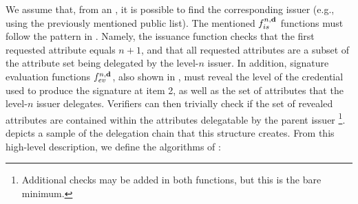 We assume that, from an \ipk, it is possible to find the corresponding issuer
(e.g., using the previously mentioned public list). The mentioned
$f_{is}^{n,\mathbf{d}}$ functions must follow the pattern in .
Namely, the issuance function checks that the first requested attribute equals
$n+1$, and that all requested attributes are a subset of the attribute set
\dattrs being delegated by the level-$n$ issuer. In addition, signature
evaluation functions $f_{ev}^{n,\mathbf{d}}$, also shown in ,
must reveal the level of the credential used to produce the \UAS signature at
item 2, as well as the set of attributes \dattrs that the level-$n$ issuer
delegates. Verifiers can then trivially check if the set of revealed attributes
are contained within the attributes delegatable by the parent issuer%
\footnote{Additional checks may be added in both functions, but this is
  the bare minimum.}.  depicts a sample of the delegation chain
that this structure creates.
%
From this high-level description, we define the algorithms of \CUASDAC:

